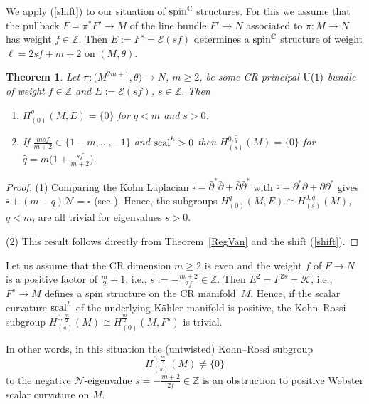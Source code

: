 \documentclass[pdftex]{sigma}
\numberwithin{equation}{section}
\newtheorem{Theorem}{Theorem}[section]
\newcommand{\ZZ}{\mathbb{Z}}
\newcommand{\CC}{\mathbb{C}}
\begin{document}
We apply (\ref{shift}) to our situation of ${\rm spin}^\CC$ structures.
For this we assume that the pullback $F=\pi^*F'\to M$ of the line bundle $F'\to N$ associated to $\pi\colon M\to N$ has weight $f\in\ZZ$.
Then $E:=F^s=\mathcal{E}(sf)$ determines a ${\rm spin}^\CC$ structure of weight $\ell=2sf+m+2$ on $(M,\theta)$.

\begin{Theorem} Let $\pi\colon \big(M^{2m+1},\theta\big)\to N$, $m\geq 2$, be some CR principal ${\rm U}(1)$-bundle of weight $f\in\ZZ$ and
$E:=\mathcal{E}(sf)$, $s\in\ZZ$. Then
\begin{enumerate}\itemsep=0pt
\item[$1.$] $H^q_{(0)}(M,E)=\{0\}$ for $q<m$ and $s>0$.
\item[$2.$] If $\frac{msf}{m+2}\in\{1-m,\dots,-1\}$ and ${\rm scal}^h>0$ then $H_{(s)}^{0,{\hat{q}}}(M)=\{0\}$ for $\hat{q}=m\big(1+\frac{sf}{m+2}\big)$.
\end{enumerate}
\end{Theorem}

\begin{proof} (1) Comparing the Kohn Laplacian $\square=\bar{\partial}^*\bar{\partial}+\bar{\partial}\bar{\partial}^*$ with
$\overline{\square}= \partial^*\partial+\partial\partial^*$ gives
$ \overline{\square}+ (m-q)\mathcal{N}=\square$
(see \cite{Tan}). Hence, the subgroups $H^q_{(0)}(M,E)\cong H^{0,q}_{(s)}(M)$, $q<m$, are all trivial for eigenvalues $s>0$.

(2) This result follows directly from Theorem~\ref{RegVan} and the shift (\ref{shift}).
\end{proof}

\begin{Example} Let us assume that the CR dimension $m\geq 2$ is even and the weight $f$ of $F\to N$ is a positive factor of $\frac{m}{2}+1$, i.e.,
$s:=-\frac{m+2}{2f}\in\ZZ$. Then $E^2=F^{2s}=\mathcal{K}$, i.e., $F^s\to M$ defines a spin structure
on the CR manifold~$M$. Hence, if the scalar curvature ${\rm scal}^h$ of the underlying K\"ahler manifold is positive,
the Kohn--Rossi subgroup $H_{(s)}^{0,\frac{m}{2}}(M)\cong H_{(0)}^{\frac{m}{2}}(M,F^s)$ is trivial.

In other words, in this situation the (untwisted) Kohn--Rossi subgroup \[ H_{(s)}^{0,\frac{m}{2}}(M) \neq \{0\}\] to the negative $\mathcal{N}$-eigenvalue $s=-\frac{m+2}{2f}\in\ZZ$
is an obstruction to positive Webster scalar curvature on $M$.
\end{Example}
\end{document}
